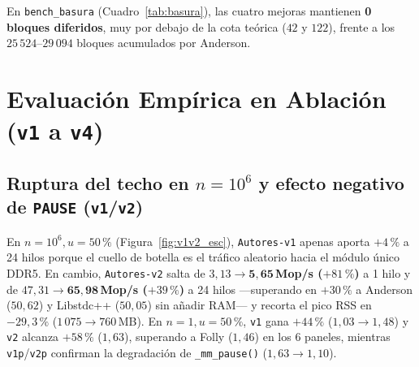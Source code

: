 \documentclass[10pt,twocolumn,a4paper]{article}
\begin{document}
En \texttt{bench\_basura} (Cuadro~\ref{tab:basura}), las cuatro mejoras mantienen \textbf{0 bloques diferidos}, muy por debajo de la cota teórica ($42$ y $122$), frente a los $25\,524\text{--}29\,094$ bloques acumulados por Anderson.

\begin{table}[H]
\centering
\caption{Memoria retenida en \texttt{bench\_basura} (mediana 3 rondas: pico de bloques vivos; límite = cota sin diferimiento).}
\label{tab:basura}
\footnotesize
{}
\end{table}

\section{Evaluación Empírica en Ablación (\texttt{v1} a \texttt{v4})}

\subsection{Ruptura del techo en $n=10^6$ y efecto negativo de \texttt{PAUSE} (\texttt{v1}/\texttt{v2})}
En $n=10^6, u=50\,\%$ (Figura~\ref{fig:v1v2_esc}), \texttt{Autores-v1} apenas aporta $+4\,\%$ a 24 hilos porque el cuello de botella es el tráfico aleatorio hacia el módulo único DDR5. En cambio, \texttt{Autores-v2} salta de $3{,}13 \to \mathbf{5{,}65}$\textbf{\,Mop/s ($+81\,\%$)} a 1 hilo y de $47{,}31 \to \mathbf{65{,}98}$\textbf{\,Mop/s ($+39\,\%$)} a 24 hilos —superando en $+30\,\%$ a Anderson ($50{,}62$) y Libstdc++ ($50{,}05$) sin añadir RAM— y recorta el pico RSS en \textbf{$-29{,}3\,\%$} ($1\,075 \to 760$\,MB). En $n=1, u=50\,\%$, \texttt{v1} gana $+44\,\%$ ($1{,}03 \to 1{,}48$) y \texttt{v2} alcanza $+58\,\%$ ($1{,}63$), superando a Folly ($1{,}46$) en los 6 paneles, mientras \texttt{v1p}/\texttt{v2p} confirman la degradación de \texttt{\_mm\_pause()} ($1{,}63 \to 1{,}10$).
\end{document}
